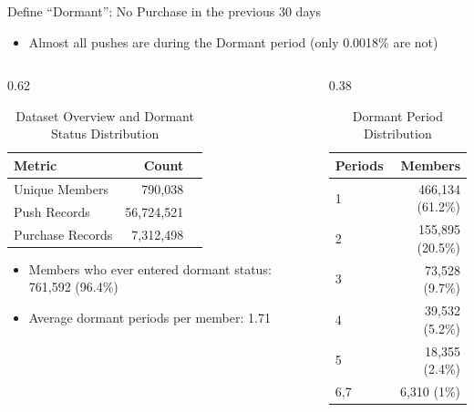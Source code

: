 \documentclass[aspectratio=169]{beamer}  %
\begin{document}
\begin{frame}{Define ``Dormant'': No Purchase in the previous 30 days}
\begin{itemize}
    \item Almost all pushes are during the Dormant period (only 0.0018\% are not)
\end{itemize}
\begin{columns}
    \begin{column}{0.62\linewidth}
        \begin{table}[h]
\centering
    \small
\caption{Dataset Overview and Dormant Status Distribution}
\label{tab:dataset_overview}
\begin{tabular}{lrr}
\toprule
\textbf{Metric} & \textbf{Count} \\
\midrule
Unique Members & 790,038 \\
Push Records & 56,724,521 \\
Purchase Records & 7,312,498 \\
\bottomrule
\end{tabular}
\end{table}
\begin{itemize}
    \item Members who ever entered dormant status: 761,592 (96.4\%)
    \item Average dormant periods per member: 1.71
\end{itemize}

\end{column}
    
\begin{column}{0.38\linewidth}
\begin{table}[h]
    \centering
    \small
    \caption{Dormant Period Distribution}
    \label{tab:dormant_periods}
    \begin{tabular}{lr}
        \toprule
        \textbf{Periods} & \textbf{Members} \\
        \midrule
        1 & 466,134 (61.2\%) \\
        2 & 155,895 (20.5\%) \\
        3 & 73,528 (9.7\%) \\
        4 & 39,532 (5.2\%) \\
        5 & 18,355 (2.4\%) \\
        6,7 & 6,310 (1\%) \\
        \bottomrule
    \end{tabular}
\end{table}
\end{column}
\end{columns}

\end{frame}
\end{document}
